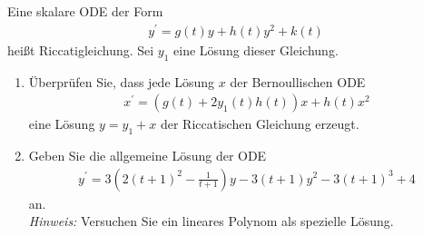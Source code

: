 \begin{exercise}
Eine skalare ODE der Form
\begin{align*}
  y^{\prime} = g(t)y + h(t)y^2 + k(t)
\end{align*}
heißt Riccatigleichung. Sei $y_1$ eine Lösung dieser Gleichung.
\begin{enumerate}[label = \textbf{\alph*)}]
  \item Überprüfen Sie, dass jede Lösung $x$ der Bernoullischen ODE
  \begin{align*}
    x^{\prime} = (g(t) + 2y_1(t)h(t))x + h(t)x^2
  \end{align*}
  eine Lösung $y = y_1 + x$ der Riccatischen Gleichung erzeugt.
  \item Geben Sie die allgemeine Lösung der ODE
  \begin{align*}
    y^{\prime} = 3\left(2(t+1)^2 - \frac{1}{t+1}\right)y - 3(t+1)y^2 - 3(t+1)^3 + 4
  \end{align*}
  an. \\
  \textit{Hinweis:} Versuchen Sie ein lineares Polynom als spezielle Lösung.
\end{enumerate}
\end{exercise}

